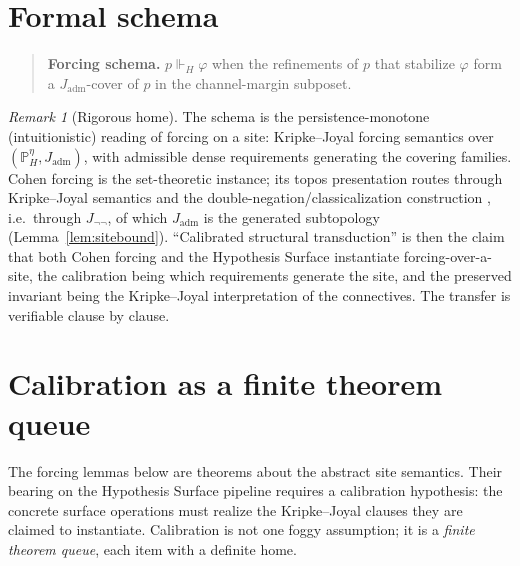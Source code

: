\documentclass[11pt]{article}
\theoremstyle{definition}
\theoremstyle{remark}
\newtheorem*{remark}{Remark}
\newcommand{\forcesH}{\Vdash_{H}}
\newcommand{\PHeta}{\mathbb{P}_{H}^{\eta}}
\newcommand{\Jadm}{J_{\mathrm{adm}}}
\newcommand{\Jnn}{J_{\neg\neg}}
\begin{document}
\section{Formal schema}\label{sec:schema}

\begin{quote}
\textbf{Forcing schema.} $p\forcesH\varphi$ when the refinements of $p$ that stabilize $\varphi$
form a $\Jadm$-cover of $p$ in the channel-margin subposet.
\end{quote}

\begin{remark}[Rigorous home]
The schema is the persistence-monotone (intuitionistic) reading of forcing on a site: Kripke--Joyal
forcing semantics over $(\PHeta,\Jadm)$, with admissible dense requirements generating the covering
families. Cohen forcing is the set-theoretic instance; its topos presentation routes through
Kripke--Joyal semantics and the double-negation/classicalization construction \cite{maclane-moerdijk},
i.e.\ through $\Jnn$, of which $\Jadm$ is the generated subtopology (Lemma~\ref{lem:sitebound}).
``Calibrated structural transduction'' is then the claim that both Cohen forcing and the Hypothesis
Surface instantiate forcing-over-a-site, the calibration being which requirements generate the site,
and the preserved invariant being the Kripke--Joyal interpretation of the connectives. The transfer is
verifiable clause by clause.
\end{remark}

\section{Calibration as a finite theorem queue}\label{sec:calibration}

The forcing lemmas below are theorems about the abstract site semantics. Their bearing on the
Hypothesis Surface pipeline requires a calibration hypothesis: the concrete surface operations must
realize the Kripke--Joyal clauses they are claimed to instantiate. Calibration is not one foggy
assumption; it is a \emph{finite theorem queue}, each item with a definite home.
\end{document}
